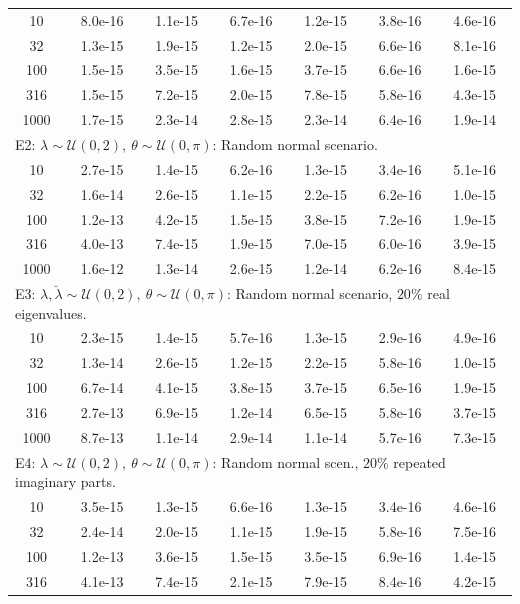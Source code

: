 \documentclass[10pt,twoside,dvipsnames]{siamart1116}
\numberwithin{algorithm}{section}
\numberwithin{equation}{section}
\begin{document}
\begin{table}[ht]
\begin{tabular}{||c||c|c||c|c||c|c||}
	 \hline
	10 & 8.0e-16 & 1.1e-15 & 6.7e-16 & 1.2e-15 & 3.8e-16 & 4.6e-16 \\
32 & 1.3e-15 & 1.9e-15 & 1.2e-15 & 2.0e-15 & 6.6e-16 & 8.1e-16 \\
100 & 1.5e-15 & 3.5e-15 & 1.6e-15 & 3.7e-15 & 6.6e-16 & 1.6e-15 \\
316 & 1.5e-15 & 7.2e-15 & 2.0e-15 & 7.8e-15 & 5.8e-16 & 4.3e-15 \\
1000 & 1.7e-15 & 2.3e-14 & 2.8e-15 & 2.3e-14 & 6.4e-16 & 1.9e-14 \\
	 \hline
	 \multicolumn{7}{||l||}{E2: $\lambda \sim \mathcal{U}(0,2),\ \theta\sim \mathcal{U}(0,\pi)$: Random normal scenario.}\\
	 \hline
	 10 & 2.7e-15 & 1.4e-15 & 6.2e-16 & 1.3e-15 & 3.4e-16 & 5.1e-16 \\
32 & 1.6e-14 & 2.6e-15 & 1.1e-15 & 2.2e-15 & 6.2e-16 & 1.0e-15 \\
100 & 1.2e-13 & 4.2e-15 & 1.5e-15 & 3.8e-15 & 7.2e-16 & 1.9e-15 \\
316 & 4.0e-13 & 7.4e-15 & 1.9e-15 & 7.0e-15 & 6.0e-16 & 3.9e-15 \\
1000 & 1.6e-12 & 1.3e-14 & 2.6e-15 & 1.2e-14 & 6.2e-16 & 8.4e-15 \\
	 \hline
	 \multicolumn{7}{||l||}{E3: $\lambda,\breve{\lambda} \sim \mathcal{U}(0,2),\ \theta\sim \mathcal{U}(0,\pi)$: Random normal scenario, $20\%$ real eigenvalues.}\\
	 \hline
	10 & 2.3e-15 & 1.4e-15 & 5.7e-16 & 1.3e-15 & 2.9e-16 & 4.9e-16 \\
32 & 1.3e-14 & 2.6e-15 & 1.2e-15 & 2.2e-15 & 5.8e-16 & 1.0e-15 \\
100 & 6.7e-14 & 4.1e-15 & 3.8e-15 & 3.7e-15 & 6.5e-16 & 1.9e-15 \\
316 & 2.7e-13 & 6.9e-15 & 1.2e-14 & 6.5e-15 & 5.8e-16 & 3.7e-15 \\
1000 & 8.7e-13 & 1.1e-14 & 2.9e-14 & 1.1e-14 & 5.7e-16 & 7.3e-15 \\
	 \hline
	 \multicolumn{7}{||l||}{E4: $\lambda\sim \mathcal{U}(0,2),\ \theta\sim \mathcal{U}(0,\pi)$: Random normal scen., $20\%$ repeated imaginary parts.}\\
	 \hline
	 10 & 3.5e-15 & 1.3e-15 & 6.6e-16 & 1.3e-15 & 3.4e-16 & 4.6e-16 \\
32 & 2.4e-14 & 2.0e-15 & 1.1e-15 & 1.9e-15 & 5.8e-16 & 7.5e-16 \\
100 & 1.2e-13 & 3.6e-15 & 1.5e-15 & 3.5e-15 & 6.9e-16 & 1.4e-15 \\
316 & 4.1e-13 & 7.4e-15 & 2.1e-15 & 7.9e-15 & 8.4e-16 & 4.2e-15 \\

\end{tabular}
\end{table}
\end{document}
